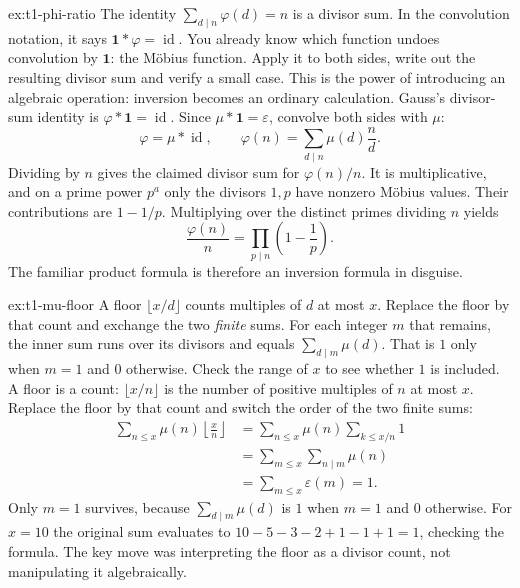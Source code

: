 \begin{solution}{ex:t1-phi-ratio}
\idea The identity $\sum_{d\mid n}\varphi(d)=n$ is a divisor sum. In the convolution notation, it says $\mathbf1*\varphi=\operatorname{id}$. You already know which function undoes convolution by $\mathbf1$: the Möbius function. Apply it to both sides, write out the resulting divisor sum and verify a small case. This is the power of introducing an algebraic operation: inversion becomes an ordinary calculation.
\writeup Gauss's divisor-sum identity is
$\varphi*\mathbf1=\operatorname{id}$. Since $\mu*\mathbf1=\varepsilon$, convolve both sides with $\mu$:
\[
\varphi=\mu*\operatorname{id},\qquad
\varphi(n)=\sum_{d\mid n}\mu(d)\frac nd.
\]
Dividing by $n$ gives the claimed divisor sum for $\varphi(n)/n$. It is multiplicative, and on a prime power $p^a$ only the divisors $1,p$ have nonzero Möbius values. Their contributions are $1-1/p$. Multiplying over the distinct primes dividing $n$ yields
\[
\frac{\varphi(n)}n=\prod_{p\mid n}\left(1-\frac1p\right).
\]
The familiar product formula is therefore an inversion formula in disguise.
\end{solution}

\begin{solution}{ex:t1-mu-floor}
\idea A floor $\lfloor x/d\rfloor$ counts multiples of $d$ at most $x$. Replace the floor by that count and exchange the two \emph{finite} sums. For each integer $m$ that remains, the inner sum runs over its divisors and equals $\sum_{d\mid m}\mu(d)$. That is $1$ only when $m=1$ and $0$ otherwise. Check the range of $x$ to see whether $1$ is included.
\writeup A floor is a count: $\lfloor x/n\rfloor$ is the number of positive multiples of $n$ at most $x$. Replace the floor by that count and switch the order of the two finite sums:
\[
\begin{aligned}
\sum_{n\le x}\mu(n)\left\lfloor\frac{x}{n}\right\rfloor
&=\sum_{n\le x}\mu(n)\sum_{k\le x/n}1\\
&=\sum_{m\le x}\sum_{n\mid m}\mu(n)\\
&=\sum_{m\le x}\varepsilon(m)=1.
\end{aligned}
\]
Only $m=1$ survives, because $\sum_{d\mid m}\mu(d)$ is $1$ when $m=1$ and $0$ otherwise. For $x=10$ the original sum evaluates to $10-5-3-2+1-1+1=1$, checking the formula. The key move was interpreting the floor as a divisor count, not manipulating it algebraically.
\end{solution}

